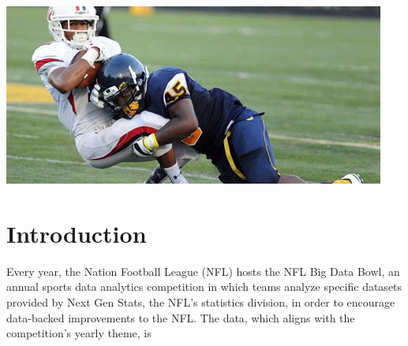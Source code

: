 \documentclass[bibtex, sigconf, hyperref={colorlinks=true,linkcolor=blue,urlcolor=blue}]{acmart}
\begin{document}



\begin{teaserfigure}
  \includegraphics[width=\textwidth]{./th-4169371817}
  \label{fig:teaser}
\end{teaserfigure}


\maketitle

\section{Introduction}

Every year, the Nation Football League (NFL) hosts the NFL Big Data Bowl, an annual
sports data analytics competition in which teams analyze specific datasets
provided by Next Gen Stats, the NFL's statistics division, in order to encourage
data-backed improvements to the NFL. The data, which aligns with the competition's yearly theme, is
\end{document}
